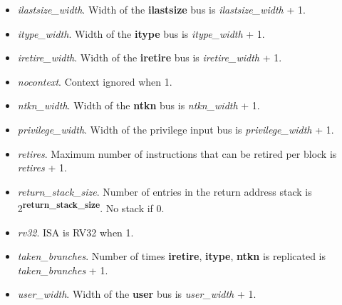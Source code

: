 \begin{itemize}
    \item \textit{ilastsize\_width}. Width of the \textbf{ilastsize} bus is \textit{ilastsize\_width} + 1.
    \item \textit{itype\_width}. Width of the \textbf{itype} bus is \textit{itype\_width} + 1.
    \item \textit{iretire\_width}. Width of the \textbf{iretire} bus is \textit{iretire\_width} + 1.
    \item \textit{nocontext}. Context ignored when 1.
    \item \textit{ntkn\_width}. Width of the \textbf{ntkn} bus is \textit{ntkn\_width} + 1.
    \item \textit{privilege\_width}. Width of the privilege input bus is \textit{privilege\_width} + 1.
    \item \textit{retires}. Maximum number of instructions that can be retired per block is \textit{retires} + 1.
    \item \textit{return\_stack\_size}. Number of entries in the return address stack is 2\textsuperscript{\textbf{return\_stack\_size}}. No stack if 0.
    \item \textit{rv32}. ISA is RV32 when 1.
    \item \textit{taken\_branches}. Number of times \textbf{iretire}, \textbf{itype}, \textbf{ntkn} is replicated is \textit{taken\_branches} + 1.
    \item \textit{user\_width}. Width of the \textbf{user} bus is \textit{user\_width} + 1.
\end{itemize}
